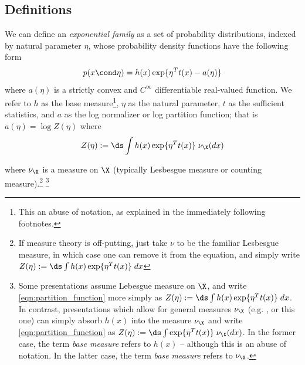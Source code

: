 \documentclass{article} %
\begin{document}
\subsection{Definitions}
\begin{definition}
We can define an \textit{exponential family} as a set of probability distributions, indexed by natural parameter $\eta$,  whose probability density functions have the following form
\begin{align}
 p(x \cond \eta) = h(x) \exp \{ \eta^T t(x) - a(\eta)\} 
\label{eqn:exponential_family_natural}
 \end{align}
where $a(\eta)$ is a strictly convex and $C^{\infty}$ differentiable real-valued function. We refer to $h$ as the base measure\footnote{This an abuse of notation, as explained in the immediately following footnotes.}, $\eta$ as the natural parameter, $t$ as the sufficient statistics, and $a$ as the log normalizer or log partition function;  that is $a(\eta) = \log Z(\eta)$ where 
\begin{equation}
\label{eqn:partition_function}
 Z(\eta) := \ds\int  h(x) \exp \{ \eta^T t(x)  \} \; \nu_\X(dx)	
\end{equation}

where $\nu_\X$ is a measure on $\X$ (typically Lesbesgue measure or counting measure).\footnote{If measure theory is off-putting, just take $\nu$ to be the familiar Lesbesgue measure, in which case one can remove it from the equation, and simply write $Z(\eta) := \ds\int  h(x) \exp \{ \eta^T t(x)  \} \; dx $ }  \footnote{Some presentations assume Lebesgue measure on $\X$, and write \eqref{eqn:partition_function} more simply as $Z(\eta) := \ds\int  h(x) \exp \{ \eta^T t(x)  \} \; dx $.  In contrast, presentations which allow for general measures $\nu_\X$ (e.g. \cite{johnson2016composing}, or this one)  can simply absorb $h(x)$ into the measure $\nu_\X$ and write \eqref{eqn:partition_function} as $Z(\eta) := \ds\int  \exp \{ \eta^T t(x)  \} \; \nu_\X (dx) $.  In the former case, the term \textit{base measure} refers to $h(x)$ -- although this is an abuse of notation.  In the latter case, the term \textit{base measure} refers to $\nu_\X$.}   
\label{def:exponential_family}
\end{definition} 
\end{document}
